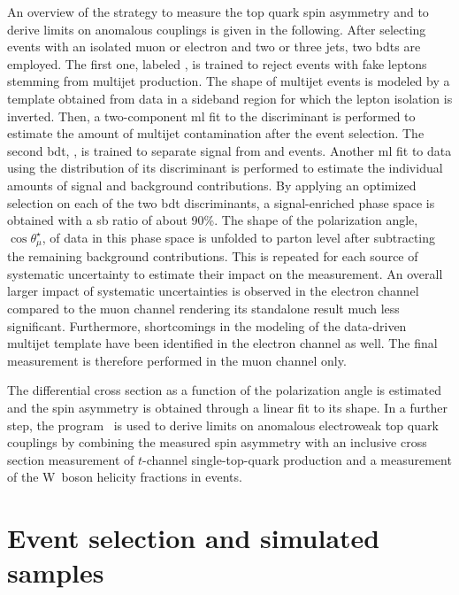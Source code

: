 An overview of the strategy to measure the top quark spin asymmetry and to derive limits on anomalous couplings is given in the following. After selecting events with an isolated muon or electron and two or three jets, two \glspl{bdt} are employed. The first one, labeled \bdtqcd, is trained to reject events with fake leptons stemming from multijet production. The shape of multijet events is modeled by a template obtained from data in a sideband region for which the lepton isolation is inverted. Then, a two-component \gls{ml} fit to the \bdtqcd discriminant is performed to estimate the amount of multijet contamination after the event selection. The second \gls{bdt}, \bdttch, is trained to separate signal from \wjets and \ttbar events. Another \gls{ml} fit to data using the distribution of its discriminant is performed to estimate the individual amounts of signal and background contributions. By applying an optimized selection on each of the two \gls{bdt} discriminants, a signal-enriched phase space is obtained with a \gls{sb} ratio of about 90\%. The shape of the polarization angle, $\cos\theta^\star_{\mu}$, of data in this phase space is unfolded to parton level after subtracting the remaining background contributions. This is repeated for each source of systematic uncertainty to estimate their impact on the measurement. An overall larger impact of systematic uncertainties is observed in the electron channel compared to the muon channel rendering its standalone result much less significant. Furthermore, shortcomings in the modeling of the data-driven multijet template have been identified in the electron channel as well. The final measurement is therefore performed in the muon channel only.

The differential cross section as a function of the polarization angle is estimated and the spin asymmetry is obtained through a linear fit to its shape. In a further step, the \TOPFIT program~\cite{topfit} is used to derive limits on anomalous electroweak top quark couplings by combining the measured spin asymmetry with an inclusive cross section measurement of $t$-channel single-top-quark production and a measurement of the W~boson helicity fractions in \ttbar events.



\section{Event selection and simulated samples}
\label{sec:polarization-selection}


